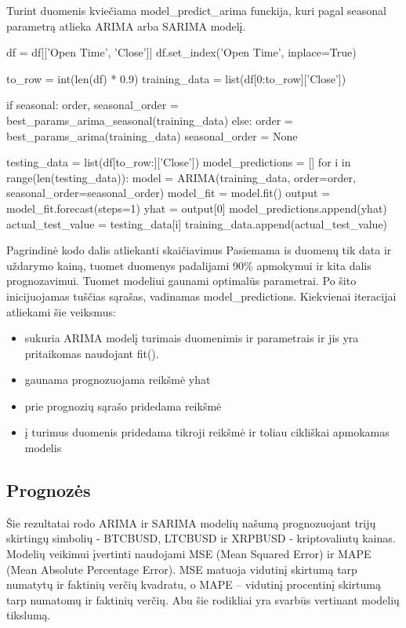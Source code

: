 \documentclass{VUMIFInfKursinis}
\begin{document}
Turint duomenis kviečiama model\_predict\_arima funckija, kuri pagal seasonal parametrą atlieka ARIMA arba SARIMA modelį.

\begin{python}
  df = df[['Open Time', 'Close']]
  df.set_index('Open Time', inplace=True)
  
  to_row = int(len(df) * 0.9)
  training_data = list(df[0:to_row]['Close'])
  
  if seasonal:
	  order, seasonal_order = best_params_arima_seasonal(training_data)
  else:
	  order = best_params_arima(training_data)
  seasonal_order = None
  
  testing_data = list(df[to_row:]['Close'])
  model_predictions = []
  for i in range(len(testing_data)):
	  model = ARIMA(training_data, order=order, seasonal_order=seasonal_order)
	  model_fit = model.fit()
	  output = model_fit.forecast(steps=1)
	  yhat = output[0]
	  model_predictions.append(yhat)
	  actual_test_value = testing_data[i]
	  training_data.append(actual_test_value)
\end{python}

Pagrindinė kodo dalis atliekanti skaičiavimus
Pasiemama is duomenų tik data ir uždarymo kainą, tuomet duomenys padalijami 90\% apmokymui ir kita dalis prognozavimui. Tuomet modeliui gaunami 
optimalūs parametrai. Po šito inicijuojamas tuščias sąrašas, vadinamas model\_predictions. Kiekvienai iteracijai atliekami šie veiksmus:

\begin{itemize}
  \item sukuria ARIMA modelį turimais duomenimis ir parametrais ir jis yra pritaikomas naudojant fit().
  \item gaunama prognozuojama reikšmė yhat
  \item prie prognozių sąrašo pridedama reikšmė
  \item į turimus duomenis pridedama tikroji reikšmė ir toliau cikliškai apmokamas modelis
\end{itemize}

\subsection{Prognozės}

Šie rezultatai rodo ARIMA ir SARIMA modelių našumą prognozuojant trijų skirtingų simbolių - BTCBUSD, LTCBUSD ir XRPBUSD - kriptovaliutų kainas.
Modelių veikimui įvertinti naudojami MSE (Mean Squared Error) ir MAPE (Mean Absolute Percentage Error). 
MSE matuoja vidutinį skirtumą tarp numatytų ir faktinių verčių kvadratu, o MAPE – vidutinį procentinį skirtumą tarp numatomų ir faktinių verčių. 
Abu šie rodikliai yra svarbūs vertinant modelių tikslumą.
\end{document}
